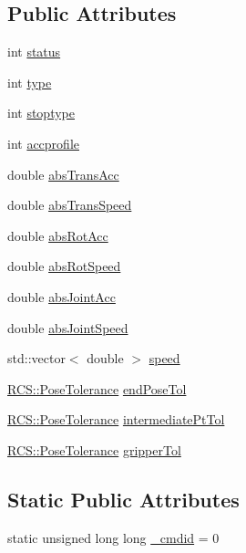 \subsection*{Public Attributes}
\begin{DoxyCompactItemize}
\item 
int \hyperlink{structRCS_1_1CanonCmd_a34ab7b913648967eac1534597830567b}{status}
\item 
int \hyperlink{structRCS_1_1CanonCmd_a490f268f30dc70285dbde1c4bff0000f}{type}
\item 
int \hyperlink{structRCS_1_1CanonCmd_ad0851df84e55dd91a0a3ae7b5759241e}{stoptype}
\item 
int \hyperlink{structRCS_1_1CanonCmd_a56e92d2a05f5ae7765d9a91eb34dcbfc}{accprofile}
\item 
double \hyperlink{structRCS_1_1CanonCmd_a129e91d931073194c3baaed83f56373e}{abs\-Trans\-Acc}
\item 
double \hyperlink{structRCS_1_1CanonCmd_abac67431174c72bbc8bc1e14916cba60}{abs\-Trans\-Speed}
\item 
double \hyperlink{structRCS_1_1CanonCmd_ae1abe3a2d6c4c54776ad46738b3bf571}{abs\-Rot\-Acc}
\item 
double \hyperlink{structRCS_1_1CanonCmd_ad7ce99c4f8d61314aef30c376ace79b7}{abs\-Rot\-Speed}
\item 
double \hyperlink{structRCS_1_1CanonCmd_ac31a9f71e4cbf531255df37780deed05}{abs\-Joint\-Acc}
\item 
double \hyperlink{structRCS_1_1CanonCmd_a0af201b279565849516543a913f443f7}{abs\-Joint\-Speed}
\item 
std\-::vector$<$ double $>$ \hyperlink{structRCS_1_1CanonCmd_aa31954bd04399469490123786ee17496}{speed}
\item 
\hyperlink{structRCS_1_1PoseTolerance}{R\-C\-S\-::\-Pose\-Tolerance} \hyperlink{structRCS_1_1CanonCmd_a8e2cd1a2125319bace4dcdffa20dcb57}{end\-Pose\-Tol}
\item 
\hyperlink{structRCS_1_1PoseTolerance}{R\-C\-S\-::\-Pose\-Tolerance} \hyperlink{structRCS_1_1CanonCmd_a48ee6631fb410cf376323c68ffe88258}{intermediate\-Pt\-Tol}
\item 
\hyperlink{structRCS_1_1PoseTolerance}{R\-C\-S\-::\-Pose\-Tolerance} \hyperlink{structRCS_1_1CanonCmd_a73bc88d51aec0ff12feb4bc2fd12e3e3}{gripper\-Tol}
\end{DoxyCompactItemize}
\subsection*{Static Public Attributes}
\begin{DoxyCompactItemize}
\item 
static unsigned long long \hyperlink{structRCS_1_1CanonCmd_ae719b5ae5d58e75b652b27df76113010}{\-\_\-cmdid} = 0
\end{DoxyCompactItemize}


